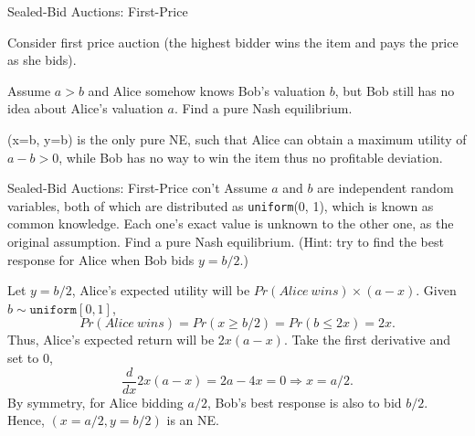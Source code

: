 \documentclass{beamer}
\begin{document}


\begin{frame}{Sealed-Bid Auctions: First-Price}

Consider first price auction (the highest bidder wins the item and pays the price as she bids).

Assume $a > b$ and Alice somehow knows Bob's valuation $b$, but Bob still has no idea about Alice's valuation $a$. Find a pure Nash 
  equilibrium.
 
\pause\alert{
(x=b, y=b) is the only pure NE, such that Alice can obtain a maximum utility of $a-b > 0$, while Bob has no way to win the item thus no profitable deviation.
}
\end{frame}


\begin{frame}{Sealed-Bid Auctions: First-Price con't}
\small{Assume $a$ and $b$ are independent random variables, both of which are distributed as \texttt{uniform}(0, 1), which is known as common knowledge. Each one's exact value is unknown to the other one, as the original assumption. Find a pure Nash 
  equilibrium. (Hint: try to find the best response for Alice when Bob bids $y=b/2$.)}

\pause\alert{\small{
 Let $y = b/2$, Alice's expected utility will be
$Pr(Alice\ wins) \times (a-x).$
Given $b \sim \texttt{uniform}[0, 1]$, $$Pr(Alice\ wins) = Pr(x \geq b/2) = Pr(b \leq 2x) = 2x.$$
Thus, Alice's expected return will be $2x(a-x)$.
Take the first derivative and set to 0,
\[
\frac{d}{dx} 2x(a-x) = 2a-4x = 0 \Rightarrow x = a/2.
\]
By symmetry, for Alice bidding $a/2$, Bob's best response is also to bid $b/2$.
Hence, $(x=a/2, y=b/2)$ is an NE.
}}
\end{frame}
\end{document}

